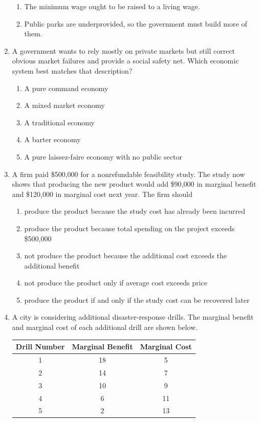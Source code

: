 \documentclass[10pt]{article}
\newenvironment{choiceslist}
  {\begin{enumerate}[label=(\Alph*), leftmargin=1.6em, itemsep=0.12em, topsep=0.18em, parsep=0pt]}
  {\end{enumerate}}
\begin{document}
\begin{multicols*}{2}
\begin{enumerate}[resume*=apq, leftmargin=*, itemsep=0.85em, topsep=0.2em, parsep=0pt]
\begin{choiceslist}
\item The minimum wage ought to be raised to a living wage.
\item Public parks are underprovided, so the government must build more of them.
\end{choiceslist}
\item A government wants to rely mostly on private markets but still correct obvious market failures and provide a social safety net. Which economic system best matches that description?
\begin{choiceslist}
\item A pure command economy
\item A mixed market economy
\item A traditional economy
\item A barter economy
\item A pure laissez-faire economy with no public sector
\end{choiceslist}
\item A firm paid \$500{,}000 for a nonrefundable feasibility study. The study now shows that producing the new product would add \$90{,}000 in marginal benefit and \$120{,}000 in marginal cost next year. The firm should
\begin{choiceslist}
\item produce the product because the study cost has already been incurred
\item produce the product because total spending on the project exceeds \$500{,}000
\item not produce the product because the additional cost exceeds the additional benefit
\item not produce the product only if average cost exceeds price
\item produce the product if and only if the study cost can be recovered later
\end{choiceslist}
\item 
                        A city is considering additional disaster-response drills. The marginal benefit and marginal cost of each additional drill are shown below.

                        \begin{center}
                        \begin{tabular}{ccc}
                        \toprule
                        Drill Number & Marginal Benefit & Marginal Cost \\
                        \midrule
                        1 & 18 & 5 \\
                        2 & 14 & 7 \\
                        3 & 10 & 9 \\
                        4 & 6 & 11 \\
                        5 & 2 & 13 \\
                        \bottomrule
                        \end{tabular}
                        \end{center}


\end{enumerate}
\end{multicols*}
\end{document}
